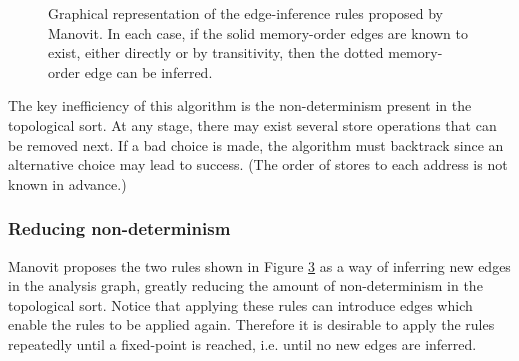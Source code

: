 \documentclass[11pt]{article}
\begin{document}
\begin{figure}[p]
\centering
\begin{subfigure}{.5\textwidth}
  \centering
{}
  \caption{}
  \label{Fig:Infer1}
\end{subfigure}%
\begin{subfigure}{.5\textwidth}
  \centering
{}
  \caption{}
  \label{Fig:Infer2}
\end{subfigure}
\caption{Graphical representation of the edge-inference rules proposed by
Manovit\cite{Manovit}.  In
each case, if the solid memory-order edges are known to exist,
either directly or
by transitivity, then the dotted memory-order edge can be inferred.}
\label{Fig:InferRules}
\end{figure}

The key inefficiency of this algorithm is the non-determinism present
in the topological sort.  At any stage, there may exist several store
operations that can be removed next.  If a bad choice is made, the
algorithm must backtrack since an alternative choice may lead to
success.  (The order of stores to each address is not known in
advance.)

\subsubsection*{Reducing non-determinism}

Manovit proposes the two rules shown in Figure \ref{Fig:InferRules} as
a way of inferring new edges in the analysis graph, greatly
reducing the amount of non-determinism in the topological sort.
Notice that applying these rules can introduce edges which enable the
rules to be applied again.  Therefore it is desirable to apply the
rules repeatedly until a fixed-point is reached, i.e. until no new
edges are inferred.
\end{document}
